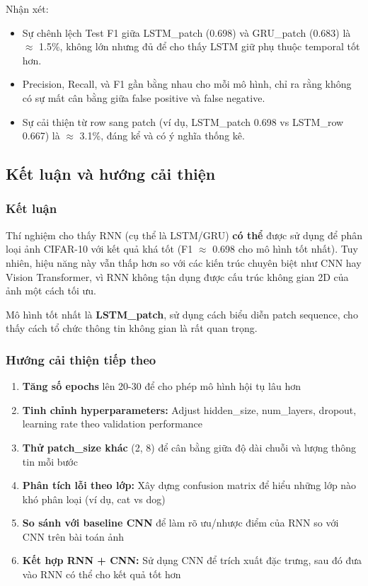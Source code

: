 Nhận xét:
\begin{itemize}
    \item Sự chênh lệch Test F1 giữa LSTM\_patch (0.698) và GRU\_patch (0.683) là $\approx$ 1.5\%, không lớn nhưng đủ để cho thấy LSTM giữ phụ thuộc temporal tốt hơn.
    \item Precision, Recall, và F1 gần bằng nhau cho mỗi mô hình, chỉ ra rằng không có sự mất cân bằng giữa false positive và false negative.
    \item Sự cải thiện từ row sang patch (ví dụ, LSTM\_patch 0.698 vs LSTM\_row 0.667) là $\approx$ 3.1\%, đáng kể và có ý nghĩa thống kê.
\end{itemize}

\subsection{Kết luận và hướng cải thiện}

\subsubsection{Kết luận}

Thí nghiệm cho thấy RNN (cụ thể là LSTM/GRU) \textbf{có thể} được sử dụng để phân loại ảnh CIFAR-10 với kết quả khá tốt (F1 $\approx$ 0.698 cho mô hình tốt nhất). Tuy nhiên, hiệu năng này vẫn thấp hơn so với các kiến trúc chuyên biệt như CNN hay Vision Transformer, vì RNN không tận dụng được cấu trúc không gian 2D của ảnh một cách tối ưu.

Mô hình tốt nhất là \textbf{LSTM\_patch}, sử dụng cách biểu diễn patch sequence, cho thấy cách tổ chức thông tin không gian là rất quan trọng.

\subsubsection{Hướng cải thiện tiếp theo}

\begin{enumerate}
    \item \textbf{Tăng số epochs} lên 20-30 để cho phép mô hình hội tụ lâu hơn
    \item \textbf{Tinh chỉnh hyperparameters:} Adjust hidden\_size, num\_layers, dropout, learning rate theo validation performance
    \item \textbf{Thử patch\_size khác} (2, 8) để cân bằng giữa độ dài chuỗi và lượng thông tin mỗi bước
    \item \textbf{Phân tích lỗi theo lớp:} Xây dựng confusion matrix để hiểu những lớp nào khó phân loại (ví dụ, cat vs dog)
    \item \textbf{So sánh với baseline CNN} để làm rõ ưu/nhược điểm của RNN so với CNN trên bài toán ảnh
    \item \textbf{Kết hợp RNN + CNN:} Sử dụng CNN để trích xuất đặc trưng, sau đó đưa vào RNN có thể cho kết quả tốt hơn
\end{enumerate}